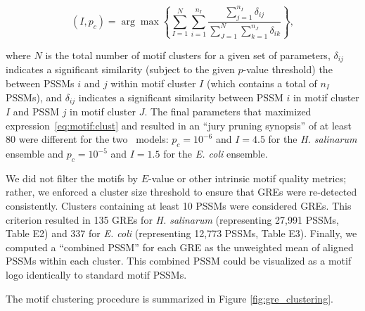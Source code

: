 \begin{equation}
\label{eq:motif:clust}
\left( I, p_c\right) = \arg \max \left\{ \sum_{I=1}^N \sum_{i=1}^{n_I} \frac{ \sum_{j=1}^{n_I} \delta_{ij} }
                            { \sum_{J=1}^N \sum_{k=1}^{n_J} \delta_{ik} } \right\},
\end{equation}

\noindent where $N$ is the total number of motif clusters for a given set of
parameters, $\delta_{ij}$ indicates a significant similarity (subject
to the given $p$-value threshold) the between PSSMs $i$ and $j$ within
motif cluster $I$ (which contains a total of $n_I$ PSSMs), and
$\delta_{ij}$ indicates a significant similarity between PSSM $i$ in
motif cluster $I$ and PSSM $j$ in motif cluster $J$. The final
parameters that maximized expression~\ref{eq:motif:clust} and
resulted in an  ``jury pruning synopsis'' of at least 80
were different for the two \egrine~models: $p_c = 10^{-6}$
and  $I = 4.5$ for the {\it H. salinarum} ensemble and
$p_c = 10^{-5}$ and  $I = 1.5$ for the {\it E. coli}
ensemble.

We did not filter the motifs by $E$-value or other intrinsic motif
quality metrics; rather, we enforced a cluster size threshold to
ensure that GREs were re-detected consistently. Clusters containing at
least 10 PSSMs were considered GREs. This criterion resulted in 135
GREs for {\it H. salinarum} (representing 27,991 PSSMs, Table E2) and
337 for {\it E. coli} (representing 12,773 PSSMs, Table E3). Finally,
we computed a ``combined PSSM'' for each GRE as the unweighted mean of
aligned PSSMs within each cluster. This combined PSSM could be
visualized as a motif logo identically to standard motif PSSMs.

The motif clustering procedure is summarized in Figure \ref{fig:gre_clustering}. 

